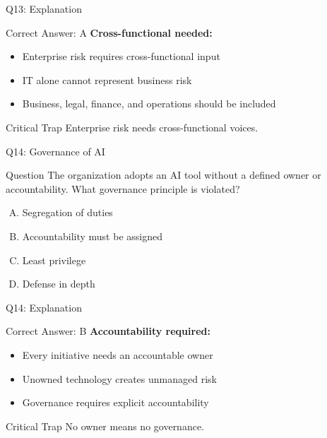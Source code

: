 \documentclass{beamer}
\begin{document}
	\begin{frame}{Q13: Explanation}
		\begin{block}{Correct Answer: A}
			\textbf{Cross-functional needed:}
			\begin{itemize}
				\item Enterprise risk requires cross-functional input
				\item IT alone cannot represent business risk
				\item Business, legal, finance, and operations should be included
			\end{itemize}
		\end{block}
		\begin{alertblock}{Critical Trap}
			Enterprise risk needs cross-functional voices.
		\end{alertblock}
	\end{frame}
	
	\begin{frame}{Q14: Governance of AI}
		\begin{block}{Question}
			The organization adopts an AI tool without a defined owner or accountability. What governance principle is violated?
		\end{block}
		\begin{enumerate}[(A)]
			\item Segregation of duties
			\item Accountability must be assigned
			\item Least privilege
			\item Defense in depth
		\end{enumerate}
	\end{frame}
	
	\begin{frame}{Q14: Explanation}
		\begin{block}{Correct Answer: B}
			\textbf{Accountability required:}
			\begin{itemize}
				\item Every initiative needs an accountable owner
				\item Unowned technology creates unmanaged risk
				\item Governance requires explicit accountability
			\end{itemize}
		\end{block}
		\begin{alertblock}{Critical Trap}
			No owner means no governance.
		\end{alertblock}
	\end{frame}
	
\end{document}
